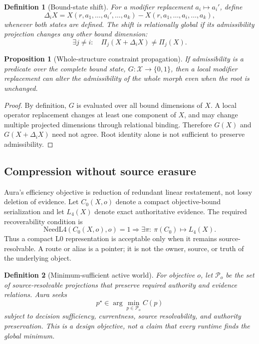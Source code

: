 \documentclass[11pt]{article}
\newtheorem{definition}{Definition}
\newtheorem{proposition}{Proposition}
\begin{document}
\begin{definition}[Bound-state shift]
For a modifier replacement \(a_i\mapsto a_i'\), define
\[
\Delta_i X
=
X(r,a_1,\ldots,a_i',\ldots,a_k)-X(r,a_1,\ldots,a_i,\ldots,a_k),
\]
whenever both states are defined.  The shift is \emph{relationally global} if
its admissibility projection changes any other bound dimension:
\[
\exists j\neq i:\quad
\Pi_j(X+\Delta_iX)\neq\Pi_j(X).
\]
\end{definition}

\begin{proposition}[Whole-structure constraint propagation]
If admissibility is a predicate over the complete bound state,
\(G:\mathcal{X}\to\{0,1\}\), then a local modifier replacement can alter the
admissibility of the whole morph even when the root is unchanged.
\end{proposition}

\begin{proof}
By definition, \(G\) is evaluated over all bound dimensions of \(X\).  A local
operator replacement changes at least one component of \(X\), and may change
multiple projected dimensions through relational binding.  Therefore
\(G(X)\) and \(G(X+\Delta_iX)\) need not agree.  Root identity alone is not
sufficient to preserve admissibility.
\end{proof}

\subsection{Compression without source erasure}

Aura's efficiency objective is reduction of redundant linear restatement, not
lossy deletion of evidence.  Let \(C_0(X,o)\) denote a compact objective-bound
serialization and let \(L_4(X)\) denote exact authoritative evidence.  The
required recoverability condition is
\[
\mathrm{NeedL4}(C_0(X,o),o)=1
\Longrightarrow
\exists\pi:\ \pi(C_0)\mapsto L_4(X).
\]
Thus a compact L0 representation is acceptable only when it remains
source-resolvable.  A route or alias is a pointer; it is not the owner, source,
or truth of the underlying object.

\begin{definition}[Minimum-sufficient active world]
For objective \(o\), let \(\mathcal{P}_o\) be the set of source-resolvable
projections that preserve required authority and evidence relations.  Aura seeks
\[
p^\star\in\arg\min_{p\in\mathcal{P}_o} C(p)
\]
subject to decision sufficiency, currentness, source resolvability, and authority
preservation.  This is a design objective, not a claim that every runtime finds
the global minimum.
\end{definition}
\end{document}
